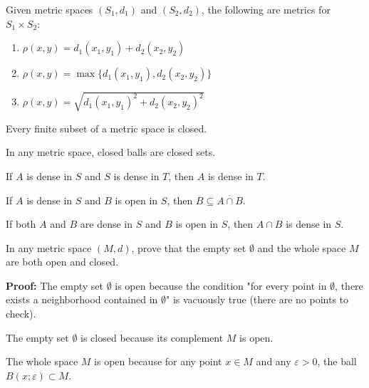 \begin{theorem}
Given metric spaces $(S_1,d_1)$ and $(S_2,d_2)$, the following are metrics for $S_1 \times S_2$:
\begin{enumerate}
\item $\rho(x,y) = d_1(x_1,y_1) + d_2(x_2,y_2)$
\item $\rho(x,y) = \max\{d_1(x_1,y_1), d_2(x_2,y_2)\}$
\item $\rho(x,y) = \sqrt{d_1(x_1,y_1)^2 + d_2(x_2,y_2)^2}$
\end{enumerate}
\end{theorem}

\begin{theorem}
Every finite subset of a metric space is closed.
\end{theorem}

\begin{theorem}
In any metric space, closed balls are closed sets.
\end{theorem}

\begin{theorem}
If $A$ is dense in $S$ and $S$ is dense in $T$, then $A$ is dense in $T$.
\end{theorem}

\begin{theorem}
If $A$ is dense in $S$ and $B$ is open in $S$, then $B \subseteq \overline{A \cap B}$.
\end{theorem}

\begin{theorem}
If both $A$ and $B$ are dense in $S$ and $B$ is open in $S$, then $A \cap B$ is dense in $S$.
\end{theorem}

\begin{problembox}
In any metric space \((M, d)\), prove that the empty set \( \emptyset \) and the whole space \( M \) are both open and closed.
\end{problembox}

\textbf{Proof:} The empty set $\emptyset$ is open because the condition "for every point in $\emptyset$, there exists a neighborhood contained in $\emptyset$" is vacuously true (there are no points to check).

The empty set $\emptyset$ is closed because its complement $M$ is open.

The whole space $M$ is open because for any point $x \in M$ and any $\varepsilon > 0$, the ball $B(x;\varepsilon) \subset M$.

